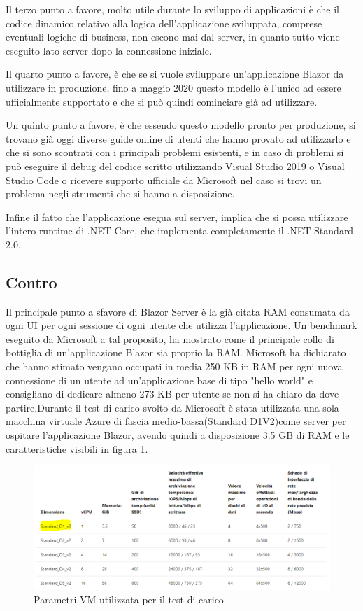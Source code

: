 Il terzo punto a favore, molto utile durante lo sviluppo di applicazioni \`e che il codice dinamico relativo alla logica dell'applicazione sviluppata, comprese eventuali logiche di business, non escono mai dal server, in quanto tutto viene eseguito lato server dopo la connessione iniziale.

Il quarto punto a favore, \`e che se si vuole sviluppare un'applicazione Blazor da utilizzare in produzione, fino a maggio 2020 questo modello \`e l'unico ad essere ufficialmente supportato e che si pu\`o quindi cominciare gi\`a ad utilizzare.

Un quinto punto a favore, \`e che essendo questo modello pronto per produzione, si trovano gi\`a oggi diverse guide online di utenti che hanno provato ad utilizzarlo e che si sono scontrati con i principali problemi esistenti, e in caso di problemi si pu\`o eseguire il debug del codice scritto utilizzando Visual Studio 2019 o Visual Studio Code o ricevere supporto ufficiale da Microsoft nel caso si trovi un problema negli strumenti che si hanno a disposizione.

Infine il fatto che l'applicazione esegua sul server, implica che si possa utilizzare l'intero runtime di .NET Core, che implementa completamente il .NET Standard 2.0.
\subsection{Contro}\label{sez:controBServer}
Il principale punto a sfavore di Blazor Server \`e la gi\`a citata RAM consumata da ogni UI per ogni sessione di ogni utente che utilizza l'applicazione.
Un benchmark eseguito da Microsoft a tal proposito, ha mostrato come il principale collo di bottiglia di un'applicazione Blazor sia proprio la RAM.
Microsoft ha dichiarato che hanno stimato vengano occupati in media 250 KB in RAM per ogni nuova connessione di un utente ad un'applicazione base di tipo "hello world" e consigliano di dedicare almeno 273 KB per utente se non si ha chiaro da dove partire.Durante il test di carico svolto da Microsoft \`e stata utilizzata una sola macchina virtuale Azure di fascia medio-bassa(Standard D1V2)come server per ospitare l'applicazione Blazor, avendo quindi a disposizione 3.5 GB di RAM e le caratteristiche visibili in figura \ref{fig:vmStandardD1V2}.

\begin{figure}[H]
	\centerline{\includegraphics[scale=0.5]{figure/Standard_D1_V2.PNG}}
	\caption{Parametri VM utilizzata per il test di carico}
	\label{fig:vmStandardD1V2}
\end{figure}

